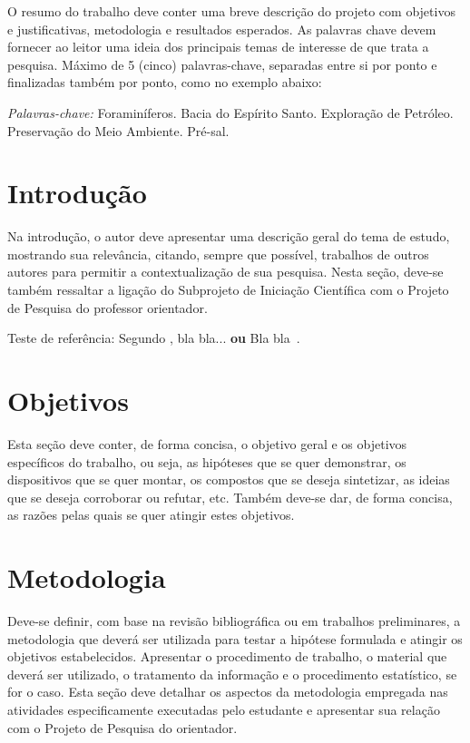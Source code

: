 \documentclass[10pt, a4paper]{article}
\begin{document}
O resumo do trabalho deve conter uma breve descrição do projeto com objetivos e justificativas, metodologia e resultados esperados. As palavras chave devem fornecer ao leitor uma ideia dos principais temas de interesse de que trata a pesquisa. Máximo de 5 (cinco) palavras-chave, separadas entre si por ponto e finalizadas também por ponto,  como no exemplo abaixo:
      
{\it Palavras-chave:} Foraminíferos. Bacia do Espírito Santo. Exploração de Petróleo. Preservação do Meio Ambiente. Pré-sal.
      

  
\section{Introdução}

Na introdução, o autor deve apresentar uma descrição geral do tema de estudo, mostrando sua relevância, citando, sempre que possível, trabalhos de outros autores para permitir a contextualização de sua pesquisa. Nesta seção, deve-se também ressaltar a ligação do Subprojeto de Iniciação Científica com o Projeto de Pesquisa do professor orientador.

Teste de referência: Segundo \cite{souza:phdthesis12}, bla bla... \textbf{ou} Bla bla~\citep{souza:phdthesis12}.


\section{Objetivos}

Esta seção deve conter, de forma concisa, o objetivo geral e os objetivos específicos do trabalho, ou seja, as hipóteses que se quer demonstrar, os dispositivos que se quer montar, os compostos que se deseja sintetizar, as ideias que se deseja corroborar ou refutar, etc. Também deve-se dar, de forma concisa, as razões pelas quais se quer atingir estes objetivos. 

 

\section{Metodologia}

Deve-se definir, com base na revisão bibliográfica ou em trabalhos preliminares, a metodologia que deverá ser utilizada para testar a hipótese formulada e atingir os objetivos estabelecidos. Apresentar o procedimento de trabalho, o material que deverá ser utilizado, o tratamento da informação e o procedimento estatístico, se for o caso. Esta seção deve detalhar os aspectos da metodologia empregada nas atividades especificamente executadas pelo estudante e apresentar sua relação com o Projeto de Pesquisa do orientador.
\end{document}
